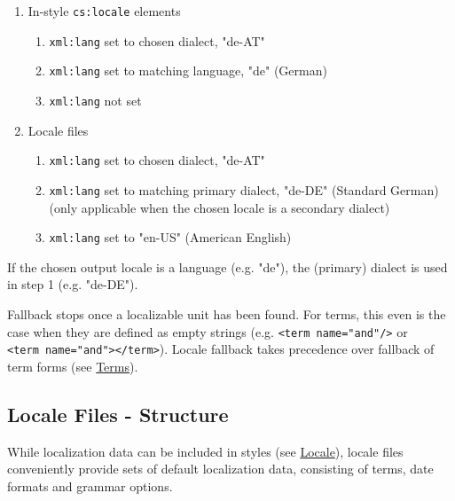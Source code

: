 \begin{enumerate}
\def\labelenumi{\Alph{enumi}.}
\tightlist
\item
  In-style \texttt{cs:locale} elements

  \begin{enumerate}
  \def\labelenumii{\arabic{enumii}.}
  \tightlist
  \item
    \texttt{xml:lang} set to chosen dialect, "de-AT"
  \item
    \texttt{xml:lang} set to matching language, "de" (German)
  \item
    \texttt{xml:lang} not set
  \end{enumerate}
\item
  Locale files

  \begin{enumerate}
  \def\labelenumii{\arabic{enumii}.}
  \setcounter{enumii}{3}
  \tightlist
  \item
    \texttt{xml:lang} set to chosen dialect, "de-AT"
  \item
    \texttt{xml:lang} set to matching primary dialect, "de-DE" (Standard
    German) (only applicable when the chosen locale is a secondary
    dialect)
  \item
    \texttt{xml:lang} set to "en-US" (American English)
  \end{enumerate}
\end{enumerate}

If the chosen output locale is a language (e.g. "de"), the (primary)
dialect is used in step 1 (e.g. "de-DE").

Fallback stops once a localizable unit has been found. For terms, this
even is the case when they are defined as empty strings (e.g.
\texttt{\textless{}term\ name="and"/\textgreater{}} or
\texttt{\textless{}term\ name="and"\textgreater{}\textless{}/term\textgreater{}}).
Locale fallback takes precedence over fallback of term forms (see
\protect\hyperlink{terms}{Terms}).

\hypertarget{locale-files---structure}{%
\subsection{Locale Files - Structure}\label{locale-files---structure}}

While localization data can be included in styles (see
\protect\hyperlink{locale}{Locale}), locale files conveniently provide
sets of default localization data, consisting of terms, date formats and
grammar options.

